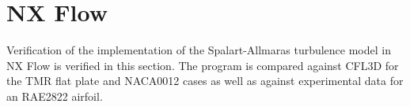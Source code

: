 \section{NX Flow}
\label{sec:resultsnx}
Verification of the implementation of the Spalart-Allmaras turbulence model in NX Flow is verified in this section. The program is compared against CFL3D for the TMR flat plate and NACA0012 cases as well as against experimental data for an RAE2822 airfoil.



%